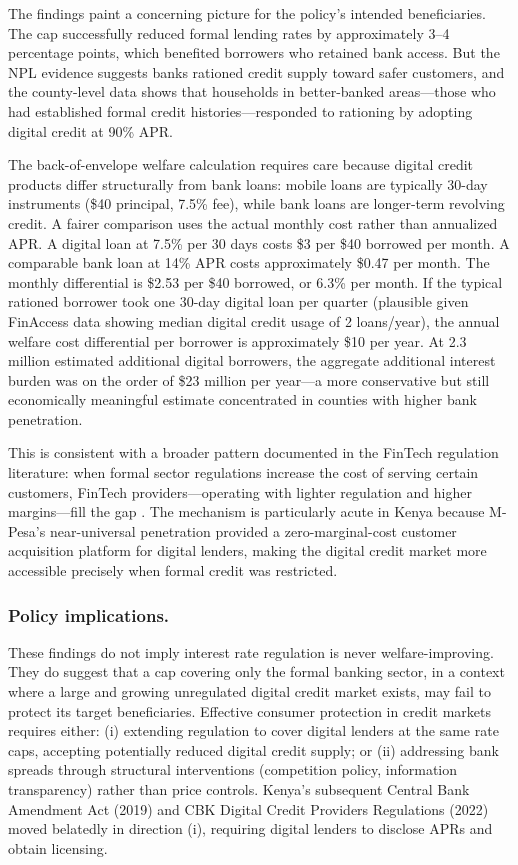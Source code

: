 \documentclass[12pt]{article}
\begin{document}
The findings paint a concerning picture for the policy's intended beneficiaries. The cap successfully reduced formal lending rates by approximately 3--4 percentage points, which benefited borrowers who retained bank access. But the NPL evidence suggests banks rationed credit supply toward safer customers, and the county-level data shows that households in better-banked areas---those who had established formal credit histories---responded to rationing by adopting digital credit at 90\% APR.

The back-of-envelope welfare calculation requires care because digital credit products differ structurally from bank loans: mobile loans are typically 30-day instruments (\$40 principal, 7.5\% fee), while bank loans are longer-term revolving credit. A fairer comparison uses the actual monthly cost rather than annualized APR. A digital loan at 7.5\% per 30 days costs \$3 per \$40 borrowed per month. A comparable bank loan at 14\% APR costs approximately \$0.47 per month. The monthly differential is \$2.53 per \$40 borrowed, or 6.3\% per month. If the typical rationed borrower took one 30-day digital loan per quarter (plausible given FinAccess data showing median digital credit usage of 2 loans/year), the annual welfare cost differential per borrower is approximately \$10 per year. At 2.3 million estimated additional digital borrowers, the aggregate additional interest burden was on the order of \$23 million per year---a more conservative but still economically meaningful estimate concentrated in counties with higher bank penetration.

This is consistent with a broader pattern documented in the FinTech regulation literature: when formal sector regulations increase the cost of serving certain customers, FinTech providers---operating with lighter regulation and higher margins---fill the gap \citep{buchak2018,fuster2019,berg2020}. The mechanism is particularly acute in Kenya because M-Pesa's near-universal penetration provided a zero-marginal-cost customer acquisition platform for digital lenders, making the digital credit market more accessible precisely when formal credit was restricted.

\subsubsection*{Policy implications.}
These findings do not imply interest rate regulation is never welfare-improving. They do suggest that a cap covering only the formal banking sector, in a context where a large and growing unregulated digital credit market exists, may fail to protect its target beneficiaries. Effective consumer protection in credit markets requires either: (i) extending regulation to cover digital lenders at the same rate caps, accepting potentially reduced digital credit supply; or (ii) addressing bank spreads through structural interventions (competition policy, information transparency) rather than price controls. Kenya's subsequent Central Bank Amendment Act (2019) and CBK Digital Credit Providers Regulations (2022) moved belatedly in direction (i), requiring digital lenders to disclose APRs and obtain licensing.
\end{document}
